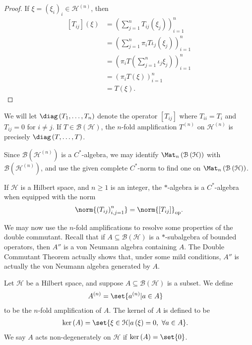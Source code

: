 \documentclass[10pt]{mypackage}
\begin{document}
\begin{proof}
  If $\xi = \left(\xi_i\right)_i \in \mathcal{H}^{(n)}$, then
  \begin{align*}
    \left[T_{ij}\right]\left(\xi\right) &= \left(\sum_{j=1}^{n}T_{ij}\left(\xi_j\right)\right)_{i=1}^{n}\\
                                        &= \left(\sum_{j=1}^{n}\pi_iT\iota_j\left(\xi_j\right)\right)_{i=1}^{n}\\
                                        &= \left(\pi_iT\left(\sum_{j=1}^{n}\iota_j\xi_j\right)\right)_{i=1}^{n}\\
                                        &= \left(\pi_iT\left(\xi\right)\right)_{i=1}^{n}\\
                                        &= T\left(\xi\right).
  \end{align*}
\end{proof}
\begin{remark}
  We will let $\diag\left(T_1,\dots,T_n\right)$ denote the operator $\left[T_{ij}\right]$ where $T_{ii} = T_i$ and $T_{ij} = 0$ for $i\neq j$. If $T\in \mathcal{B}\left(\mathcal{H}\right)$, the $n$-fold amplification $T^{(n)}$ on $\mathcal{H}^{(n)}$ is precisely $\diag\left(T,\dots,T\right)$.
\end{remark}
Since $\mathcal{B}\left(\mathcal{H}^{(n)}\right)$ is a $C^{\ast}$-algebra, we may identify $\Mat_{n}\left(\mathcal{B}\left(\mathcal{H}\right)\right)$ with $\mathcal{B}\left(\mathcal{H}^{(n)}\right)$, and use the given complete $C^{\ast}$-norm to find one on $\Mat_{n}\left(\mathcal{B}\left(\mathcal{H}\right)\right)$.
\begin{corollary}[]
  If $\mathcal{H}$ is a Hilbert space, and $n\geq 1$ is an integer, the $\ast$-algebra is a $C^{\ast}$-algebra when equipped with the norm
  \begin{align*}
    \norm{\left(T_{ij}\right)_{i,j=1}^{n}} = \norm{\left[T_{ij}\right]}_{\text{op}}.
  \end{align*}
\end{corollary}
We may now use the $n$-fold amplifications to resolve some properties of the double commutant. Recall that if $A\subseteq \mathcal{B}\left(\mathcal{H}\right)$ is a $\ast$-subalgebra of bounded operators, then $A''$ is a von Neumann algebra containing $A$. The Double Commutant Theorem actually shows that, under some mild conditions, $A''$ is actually the von Neumann algebra generated by $A$.
\begin{definition}[]
  Let $\mathcal{H}$ be a Hilbert space, and suppose $A\subseteq \mathcal{B}\left(\mathcal{H}\right)$ is a subset. We define
  \begin{align*}
    A^{(n)} &= \set{a^{(n)} | a\in A}
  \end{align*}
  to be the $n$-fold amplification of $A$. The kernel of $A$ is defined to be
  \begin{align*}
    \ker\left(A\right) &= \set{\xi\in \mathcal{H} | a\left(\xi\right) = 0,~\forall a\in A}.
  \end{align*}
  We say $A$ acts non-degenerately on $\mathcal{H}$ if $\ker\left(A\right) = \set{0}$.
\end{definition}
\end{document}
